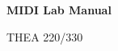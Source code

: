 \begin{titlepage}
        \vspace*{1cm}
        
        \Huge
        \textbf{MIDI Lab Manual}
        
        \vspace{0.5cm}
        \LARGE
        THEA 220/330
        

        
        \vfill
        \end{titlepage}